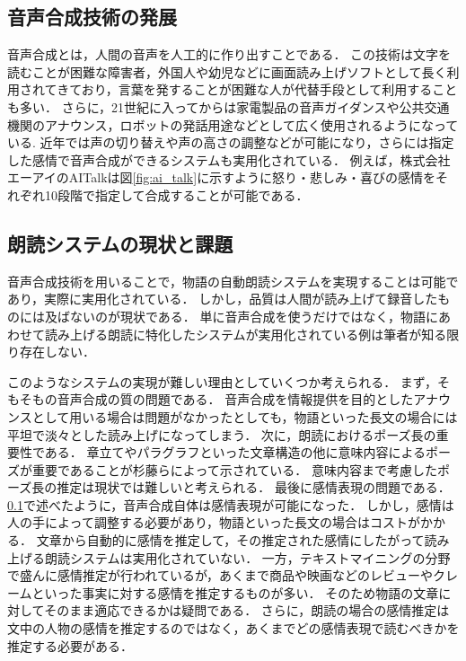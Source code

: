\subsection{音声合成技術の発展}\label{subsec:speech_synthesis}
音声合成とは，人間の音声を人工的に作り出すことである．
この技術は文字を読むことが困難な障害者，外国人や幼児などに画面読み上げソフトとして長く利用されてきており，言葉を発することが困難な人が代替手段として利用することも多い．
さらに，21世紀に入ってからは家電製品の音声ガイダンスや公共交通機関のアナウンス，ロボットの発話用途などとして広く使用されるようになっている.
近年では声の切り替えや声の高さの調整などが可能になり，さらには指定した感情で音声合成ができるシステムも実用化されている．
例えば，株式会社エーアイのAITalkは図\ref{fig:ai_talk}に示すように怒り・悲しみ・喜びの感情をそれぞれ10段階で指定して合成することが可能である．

\subsection{朗読システムの現状と課題}\label{subsec:reading_system}
音声合成技術を用いることで，物語の自動朗読システムを実現することは可能であり，実際に実用化されている．
しかし，品質は人間が読み上げて録音したものには及ばないのが現状である．
単に音声合成を使うだけではなく，物語にあわせて読み上げる朗読に特化したシステムが実用化されている例は筆者が知る限り存在しない．


このようなシステムの実現が難しい理由としていくつか考えられる．
まず，そもそもの音声合成の質の問題である．
音声合成を情報提供を目的としたアナウンスとして用いる場合は問題がなかったとしても，物語といった長文の場合には平坦で淡々とした読み上げになってしまう．
次に，朗読におけるポーズ長の重要性である．
章立てやパラグラフといった文章構造の他に意味内容によるポーズが重要であることが杉藤ら\cite{sugifuji}によって示されている．
意味内容まで考慮したポーズ長の推定は現状では難しいと考えられる．
最後に感情表現の問題である．
\ref{subsec:speech_synthesis}で述べたように，音声合成自体は感情表現が可能になった．
しかし，感情は人の手によって調整する必要があり，物語といった長文の場合はコストがかかる．
文章から自動的に感情を推定して，その推定された感情にしたがって読み上げる朗読システムは実用化されていない．
一方，テキストマイニングの分野で盛んに感情推定が行われているが，あくまで商品や映画などのレビューやクレームといった事実に対する感情を推定するものが多い．
そのため物語の文章に対してそのまま適応できるかは疑問である．
さらに，朗読の場合の感情推定は文中の人物の感情を推定するのではなく，あくまでどの感情表現で読むべきかを推定する必要がある．

